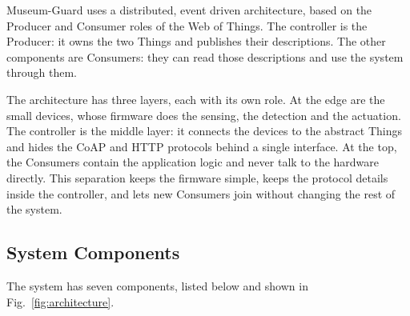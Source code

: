 \documentclass[conference]{IEEEtran}
\begin{document}
Museum-Guard uses a distributed, event driven architecture, based on the Producer and Consumer roles of the Web of Things. The controller is the Producer: it owns the two Things and publishes their descriptions. The other components are Consumers: they can read those descriptions and use the system through them.

The architecture has three layers, each with its own role. At the edge are the small devices, whose firmware does the sensing, the detection and the actuation. The controller is the middle layer: it connects the devices to the abstract Things and hides the CoAP and HTTP protocols behind a single interface. At the top, the Consumers contain the application logic and never talk to the hardware directly. This separation keeps the firmware simple, keeps the protocol details inside the controller, and lets new Consumers join without changing the rest of the system.

\subsection{System Components}
The system has seven components, listed below and shown in Fig.~\ref{fig:architecture}.
\end{document}
